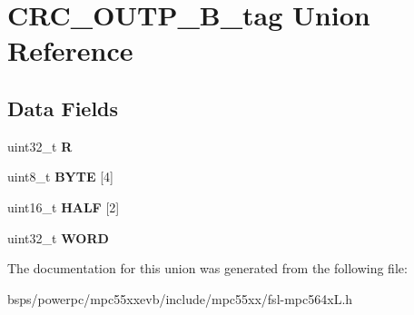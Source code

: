 \hypertarget{unionCRC__OUTP__32B__tag}{}\section{C\+R\+C\+\_\+\+O\+U\+T\+P\+\_\+B\+\_\+tag Union Reference}
\label{unionCRC__OUTP__32B__tag}
\subsection*{Data Fields}
\begin{DoxyCompactItemize}
\item 
\mbox{\label{unionCRC__OUTP__32B__tag_a648a8fa89a2d705f854aa4503cef86ad}} 
uint32\+\_\+t {\bfseries R}
\item 
\mbox{\label{unionCRC__OUTP__32B__tag_a2844831591b899ac73d92247b4dbe8bf}} 
uint8\+\_\+t {\bfseries B\+Y\+TE} \mbox{[}4\mbox{]}
\item 
\mbox{\label{unionCRC__OUTP__32B__tag_a7aa59dedc7e9eb33652df72a3b4ffbe0}} 
uint16\+\_\+t {\bfseries H\+A\+LF} \mbox{[}2\mbox{]}
\item 
\mbox{\label{unionCRC__OUTP__32B__tag_ad0d3ff98cd9fb0cf0e6ddd3939acc253}} 
uint32\+\_\+t {\bfseries W\+O\+RD}
\end{DoxyCompactItemize}


The documentation for this union was generated from the following file\+:\begin{DoxyCompactItemize}
\item 
bsps/powerpc/mpc55xxevb/include/mpc55xx/fsl-\/mpc564x\+L.\+h\end{DoxyCompactItemize}
